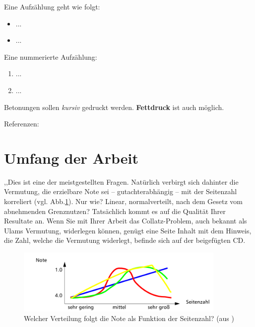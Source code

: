 Eine Aufzählung geht wie folgt:
\begin{itemize}
	\item ...
	\item ...
\end{itemize}
Eine nummerierte Aufzählung:
\begin{enumerate}
	\item ...
	\item ...
\end{enumerate}

Betonungen sollen \emph{kursiv} gedruckt werden. 
\textbf{Fettdruck} ist auch möglich.

Referenzen: \cite{SaaSchTue97,TueConSaa96ismis,SchTueSaa98preprint}

\section[Arbeit]{Umfang der Arbeit}
,,Dies ist eine der meistgestellten Fragen. Natürlich verbirgt sich dahinter die Vermutung, die erzielbare Note sei – gutachterabhängig – mit der Seitenzahl korreliert (vgl. Abb.\ref*{fig2_2}). Nur
wie? Linear, normalverteilt, nach dem Gesetz vom abnehmenden Grenznutzen?
Tatsächlich kommt es auf die Qualität Ihrer Resultate an. Wenn Sie mit Ihrer Arbeit das Collatz-Problem, auch bekannt als Ulams Vermutung, widerlegen können, genügt eine Seite Inhalt mit dem Hinweis, die Zahl, welche die Vermutung widerlegt, befinde sich auf der beigefügten CD.

\begin{figure}[htb]
  \centering
  \includegraphics[width=0.9\textwidth]{figures/note-page.png}
  \caption[Verteilung: Seitenanzahl-Note]{Welcher Verteilung folgt die Note als Funktion der Seitenzahl? (aus \cite{Wegner16}) }
\label{fig2_2}
\end{figure}

